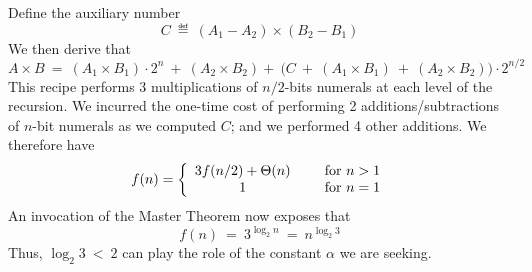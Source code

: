 \begin{itemize}
\begin{enumerate}
Define the auxiliary number
\[ C \ \eqdef \ (A_1 - A_2) \times (B_2 - B_1) \]
We then derive that
\[
A \times B \ = \ (A_1 \times B_1) \cdot 2^n \ + \ (A_2 \times B_2) + \ \big(C \ + \ (A_1 \times B_1) \ + \ (A_2 \times B_2) \big) \cdot 2^{n/2}
\]
This recipe performs 3 multiplications of $n/2$-bits numerals at each level of the recursion.  We incurred the one-time cost of performing 2 additions/subtractions of $n$-bit numerals as we computed $C$; and we performed 4 other additions.   We therefore have
\[
f(n) = \left\{
\begin{array}{cl}
3 f(n/2) + \Theta(n) & \hspace*{.2in} \mbox{for } n > 1 \\
                            1 & \hspace*{.2in} \mbox{for } n = 1
\end{array}
\right. 
\]
An invocation of the Master Theorem now exposes that
\[ f(n) \ = \ 3^{\log_2 n} \ = \ n^{\log_2 3} \]
Thus, $\log_2 3 \ < \ 2$ can play the role of the constant $\alpha$ we are seeking.
\end{enumerate}
\end{itemize}




